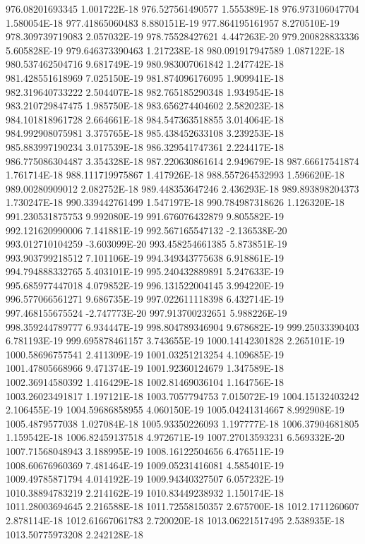 976.08201693345  1.001722E-18
976.527561490577  1.555389E-18
976.973106047704  1.580054E-18
977.41865060483  8.880151E-19
977.864195161957  8.270510E-19
978.309739719083  2.057032E-19
978.75528427621  4.447263E-20
979.200828833336  5.605828E-19
979.646373390463  1.217238E-18
980.091917947589  1.087122E-18
980.537462504716  9.681749E-19
980.983007061842  1.247742E-18
981.428551618969  7.025150E-19
981.874096176095  1.909941E-18
982.319640733222  2.504407E-18
982.765185290348  1.934954E-18
983.210729847475  1.985750E-18
983.656274404602  2.582023E-18
984.101818961728  2.664661E-18
984.547363518855  3.014064E-18
984.992908075981  3.375765E-18
985.438452633108  3.239253E-18
985.883997190234  3.017539E-18
986.329541747361  2.224417E-18
986.775086304487  3.354328E-18
987.220630861614  2.949679E-18
987.66617541874  1.761714E-18
988.111719975867  1.417926E-18
988.557264532993  1.596620E-18
989.00280909012  2.082752E-18
989.448353647246  2.436293E-18
989.893898204373  1.730247E-18
990.339442761499  1.547197E-18
990.784987318626  1.126320E-18
991.230531875753  9.992080E-19
991.676076432879  9.805582E-19
992.121620990006  7.141881E-19
992.567165547132  -2.136538E-20
993.012710104259  -3.603099E-20
993.458254661385  5.873851E-19
993.903799218512  7.101106E-19
994.349343775638  6.918861E-19
994.794888332765  5.403101E-19
995.240432889891  5.247633E-19
995.685977447018  4.079852E-19
996.131522004145  3.994220E-19
996.577066561271  9.686735E-19
997.022611118398  6.432714E-19
997.468155675524  -2.747773E-20
997.913700232651  5.988226E-19
998.359244789777  6.934447E-19
998.804789346904  9.678682E-19
999.25033390403  6.781193E-19
999.695878461157  3.743655E-19
1000.14142301828  2.265101E-19
1000.58696757541  2.411309E-19
1001.03251213254  4.109685E-19
1001.47805668966  9.471374E-19
1001.92360124679  1.347589E-18
1002.36914580392  1.416429E-18
1002.81469036104  1.164756E-18
1003.26023491817  1.197121E-18
1003.7057794753  7.015072E-19
1004.15132403242  2.106455E-19
1004.59686858955  4.060150E-19
1005.04241314667  8.992908E-19
1005.4879577038  1.027084E-18
1005.93350226093  1.197777E-18
1006.37904681805  1.159542E-18
1006.82459137518  4.972671E-19
1007.27013593231  6.569332E-20
1007.71568048943  3.188995E-19
1008.16122504656  6.476511E-19
1008.60676960369  7.481464E-19
1009.05231416081  4.585401E-19
1009.49785871794  4.014192E-19
1009.94340327507  6.057232E-19
1010.38894783219  2.214162E-19
1010.83449238932  1.150174E-18
1011.28003694645  2.216588E-18
1011.72558150357  2.675700E-18
1012.1711260607  2.878114E-18
1012.61667061783  2.720020E-18
1013.06221517495  2.538935E-18
1013.50775973208  2.242128E-18
